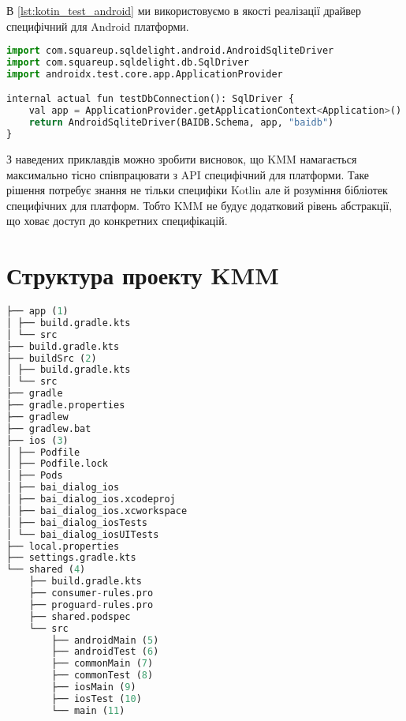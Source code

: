 В \ref{lst:kotin_test_android} ми використовуємо в якості реалізації драйвер специфічний для Android платформи.

\begin{lstlisting}[style=light, language=Python,label={lst:kotin_test_android},caption=Android SQLDriver]
import com.squareup.sqldelight.android.AndroidSqliteDriver
import com.squareup.sqldelight.db.SqlDriver
import androidx.test.core.app.ApplicationProvider

internal actual fun testDbConnection(): SqlDriver {
    val app = ApplicationProvider.getApplicationContext<Application>()
    return AndroidSqliteDriver(BAIDB.Schema, app, "baidb")
}
\end{lstlisting}

З наведених приклавдів можно зробити висновок, що KMM намагається максимально тісно співпрацювати з API специфічний для платформи.
Таке рішення потребує знання не тільки специфіки Kotlin але й розуміння бібліотек специфічних для платформ.
Тобто KMM не будує додатковий рівень абстракції, що ховає доступ до конкретних специфікацій.


\section{Структура проекту KMM}
\label{section.4.5}

\begin{lstlisting}[style=light, language=Python,label={lst:kmm_project_layout},caption=KMM Project Layout]
├── app (1)
│ ├── build.gradle.kts
│ └── src
├── build.gradle.kts
├── buildSrc (2)
│ ├── build.gradle.kts
│ └── src
├── gradle
├── gradle.properties
├── gradlew
├── gradlew.bat
├── ios (3)
│ ├── Podfile
│ ├── Podfile.lock
│ ├── Pods
│ ├── bai_dialog_ios
│ ├── bai_dialog_ios.xcodeproj
│ ├── bai_dialog_ios.xcworkspace
│ ├── bai_dialog_iosTests
│ └── bai_dialog_iosUITests
├── local.properties
├── settings.gradle.kts
└── shared (4)
    ├── build.gradle.kts
    ├── consumer-rules.pro
    ├── proguard-rules.pro
    ├── shared.podspec
    └── src
        ├── androidMain (5)
        ├── androidTest (6)
        ├── commonMain (7)
        ├── commonTest (8)
        ├── iosMain (9)
        ├── iosTest (10)
        └── main (11)
\end{lstlisting}

